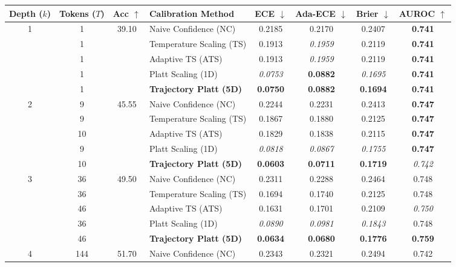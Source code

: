 \begin{table}[t]
\setlength{\tabcolsep}{4pt}
\renewcommand{\arraystretch}{1.05}
\centering
\footnotesize
\begin{tabular}{ccclcccc}
\toprule
\textbf{Depth ($k$)} & \textbf{Tokens ($T$)} & \textbf{Acc} $\uparrow$ & \textbf{Calibration Method} & \textbf{ECE} $\downarrow$ & \textbf{Ada-ECE} $\downarrow$ & \textbf{Brier} $\downarrow$ & \textbf{AUROC} $\uparrow$ \\
\midrule
\multirow{5}{*}{1} & 1 & \multirow{5}{*}{39.10} & Naive Confidence (NC) & 0.2185 & 0.2170 & 0.2407 & \textbf{0.741} \\
 & 1 &  & Temperature Scaling (TS) & 0.1913 & \textit{0.1959} & 0.2119 & \textbf{0.741} \\
 & 1 &  & Adaptive TS (ATS) & 0.1913 & \textit{0.1959} & 0.2119 & \textbf{0.741} \\
 & 1 &  & Platt Scaling (1D) & \textit{0.0753} & \textbf{0.0882} & \textit{0.1695} & \textbf{0.741} \\
 & 1 &  & \textbf{Trajectory Platt (5D)} & \textbf{0.0750} & \textbf{0.0882} & \textbf{0.1694} & \textbf{0.741} \\
\midrule
\multirow{5}{*}{2} & 9 & \multirow{5}{*}{45.55} & Naive Confidence (NC) & 0.2244 & 0.2231 & 0.2413 & \textbf{0.747} \\
 & 9 &  & Temperature Scaling (TS) & 0.1867 & 0.1880 & 0.2125 & \textbf{0.747} \\
 & 10 &  & Adaptive TS (ATS) & 0.1829 & 0.1838 & 0.2115 & \textbf{0.747} \\
 & 9 &  & Platt Scaling (1D) & \textit{0.0818} & \textit{0.0867} & \textit{0.1755} & \textbf{0.747} \\
 & 10 &  & \textbf{Trajectory Platt (5D)} & \textbf{0.0603} & \textbf{0.0711} & \textbf{0.1719} & \textit{0.742} \\
\midrule
\multirow{5}{*}{3} & 36 & \multirow{5}{*}{49.50} & Naive Confidence (NC) & 0.2311 & 0.2288 & 0.2464 & 0.748 \\
 & 36 &  & Temperature Scaling (TS) & 0.1694 & 0.1740 & 0.2125 & 0.748 \\
 & 46 &  & Adaptive TS (ATS) & 0.1631 & 0.1701 & 0.2109 & \textit{0.750} \\
 & 36 &  & Platt Scaling (1D) & \textit{0.0890} & \textit{0.0981} & \textit{0.1843} & 0.748 \\
 & 46 &  & \textbf{Trajectory Platt (5D)} & \textbf{0.0634} & \textbf{0.0680} & \textbf{0.1776} & \textbf{0.759} \\
\midrule
\multirow{5}{*}{4} & 144 & \multirow{5}{*}{51.70} & Naive Confidence (NC) & 0.2343 & 0.2321 & 0.2494 & 0.742 \\

\end{tabular}
\end{table}
